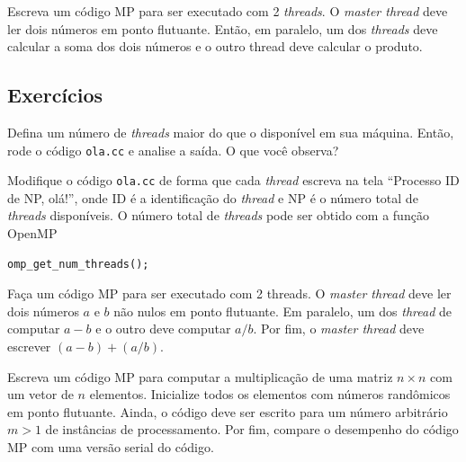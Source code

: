\begin{exeresol}
  Escreva um código MP para ser executado com 2 {\it threads}. O {\it master thread} deve ler dois números em ponto flutuante. Então, em paralelo, um dos {\it threads} deve calcular a soma dos dois números e o outro thread deve calcular o produto.
\end{exeresol}
\begin{resol}
  
\end{resol}

\subsection*{Exercícios}

\begin{exer}
  Defina um número de {\it threads} maior do que o disponível em sua máquina. Então, rode o código \verb+ola.cc+ e analise a saída. O que você observa?
\end{exer}

\begin{exer}
  Modifique o código \verb+ola.cc+ de forma que cada {\it thread} escreva na tela ``Processo ID de NP, olá!'', onde ID é a identificação do {\it thread} e NP é o número total de {\it threads} disponíveis. O número total de {\it threads} pode ser obtido com a função OpenMP
\begin{verbatim}
omp_get_num_threads();
\end{verbatim}
\end{exer}

\begin{exer}
  Faça um código MP para ser executado com 2 threads. O {\it master thread} deve ler dois números $a$ e $b$ não nulos em ponto flutuante. Em paralelo, um dos {\it thread} de computar $a-b$ e o outro deve computar $a/b$. Por fim, o {\it master thread} deve escrever $(a-b) + (a/b)$.
\end{exer}

\begin{exer}\label{exer:cc_exer_Ax}
  Escreva um código MP para computar a multiplicação de uma matriz $n\times n$ com um vetor de $n$ elementos. Inicialize todos os elementos com números randômicos em ponto flutuante. Ainda, o código deve ser escrito para um número arbitrário $m>1$ de instâncias de processamento. Por fim, compare o desempenho do código MP com uma versão serial do código.
\end{exer}

